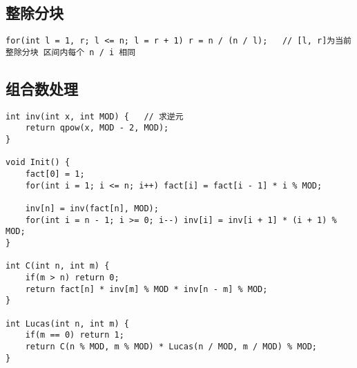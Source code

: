 \subsection{整除分块}
\begin{lstlisting}
for(int l = 1, r; l <= n; l = r + 1) r = n / (n / l);	// [l, r]为当前整除分块 区间内每个 n / i 相同 
\end{lstlisting}

\subsection{组合数处理}
\begin{lstlisting}
int inv(int x, int MOD) {	// 求逆元 
	return qpow(x, MOD - 2, MOD);
}

void Init() {
	fact[0] = 1;
	for(int i = 1; i <= n; i++) fact[i] = fact[i - 1] * i % MOD;

	inv[n] = inv(fact[n], MOD);
	for(int i = n - 1; i >= 0; i--) inv[i] = inv[i + 1] * (i + 1) % MOD;
}

int C(int n, int m) {
	if(m > n) return 0;
	return fact[n] * inv[m] % MOD * inv[n - m] % MOD;
}

int Lucas(int n, int m) {
	if(m == 0) return 1;
	return C(n % MOD, m % MOD) * Lucas(n / MOD, m / MOD) % MOD;
}
\end{lstlisting}
